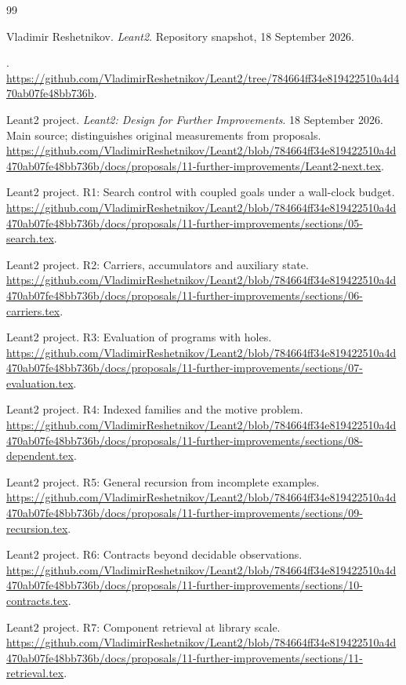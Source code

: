 \documentclass[11pt,a4paper]{article}
\newcommand{\code}[1]{\texttt{\detokenize{#1}}}
\theoremstyle{definition}
\theoremstyle{remark}
\begin{document}
\clearpage
{}
\begin{thebibliography}{99}\small\raggedright

Vladimir Reshetnikov. \emph{Leant2}. Repository snapshot, 18 September 2026.\par
\code{784664ff34e819422510a4d470ab07fe48bb736b}.
\url{https://github.com/VladimirReshetnikov/Leant2/tree/784664ff34e819422510a4d470ab07fe48bb736b}.

Leant2 project. \emph{Leant2: Design for Further Improvements}. 18 September 2026. Main source; distinguishes original measurements from proposals.
\url{https://github.com/VladimirReshetnikov/Leant2/blob/784664ff34e819422510a4d470ab07fe48bb736b/docs/proposals/11-further-improvements/Leant2-next.tex}.

Leant2 project. R1: Search control with coupled goals under a wall-clock budget.
\url{https://github.com/VladimirReshetnikov/Leant2/blob/784664ff34e819422510a4d470ab07fe48bb736b/docs/proposals/11-further-improvements/sections/05-search.tex}.

Leant2 project. R2: Carriers, accumulators and auxiliary state.
\url{https://github.com/VladimirReshetnikov/Leant2/blob/784664ff34e819422510a4d470ab07fe48bb736b/docs/proposals/11-further-improvements/sections/06-carriers.tex}.

Leant2 project. R3: Evaluation of programs with holes.
\url{https://github.com/VladimirReshetnikov/Leant2/blob/784664ff34e819422510a4d470ab07fe48bb736b/docs/proposals/11-further-improvements/sections/07-evaluation.tex}.

Leant2 project. R4: Indexed families and the motive problem.
\url{https://github.com/VladimirReshetnikov/Leant2/blob/784664ff34e819422510a4d470ab07fe48bb736b/docs/proposals/11-further-improvements/sections/08-dependent.tex}.

Leant2 project. R5: General recursion from incomplete examples.
\url{https://github.com/VladimirReshetnikov/Leant2/blob/784664ff34e819422510a4d470ab07fe48bb736b/docs/proposals/11-further-improvements/sections/09-recursion.tex}.

Leant2 project. R6: Contracts beyond decidable observations.
\url{https://github.com/VladimirReshetnikov/Leant2/blob/784664ff34e819422510a4d470ab07fe48bb736b/docs/proposals/11-further-improvements/sections/10-contracts.tex}.

Leant2 project. R7: Component retrieval at library scale.
\url{https://github.com/VladimirReshetnikov/Leant2/blob/784664ff34e819422510a4d470ab07fe48bb736b/docs/proposals/11-further-improvements/sections/11-retrieval.tex}.


\end{thebibliography}
\end{document}
